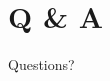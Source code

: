 \documentclass[
    fontset=fandol,
    xcolor=svgnames %
]{ctexbeamer}
\begin{document}
\section{Q \& A}

\begin{frame}

    \begin{block}{Questions?}
        ~\\
        ~\\
        \\
        ~\\
        ~\\
        ~\\
        ~\\
    \end{block}

\end{frame}
\end{document}
